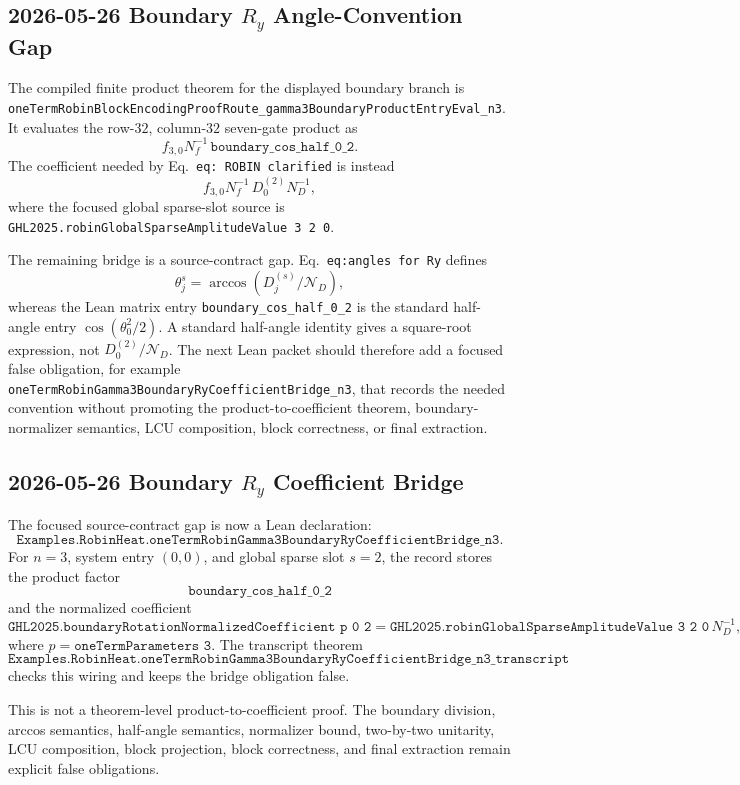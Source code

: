 \subsection{2026-05-26 Boundary \(R_y\) Angle-Convention Gap}

The compiled finite product theorem for the displayed boundary branch is
\texttt{oneTermRobinBlockEncodingProofRoute\_gamma3BoundaryProductEntryEval\_n3}.
It evaluates the row-\(32\), column-\(32\) seven-gate product as
\[
  f_{3,0}N_f^{-1}\,
  \texttt{boundary\_cos\_half\_0\_2}.
\]
The coefficient needed by Eq.~\texttt{eq: ROBIN clarified} is instead
\[
  f_{3,0}N_f^{-1}\,D_0^{(2)}N_D^{-1},
\]
where the focused global sparse-slot source is
\texttt{GHL2025.robinGlobalSparseAmplitudeValue 3 2 0}.

The remaining bridge is a source-contract gap.  Eq.~\texttt{eq:angles for Ry}
defines
\[
  \theta_j^s = \arccos(D_j^{(s)}/\mathcal{N}_D),
\]
whereas the Lean matrix entry
\texttt{boundary\_cos\_half\_0\_2} is the standard half-angle entry
\(\cos(\theta_0^2/2)\).  A standard half-angle identity gives a square-root
expression, not \(D_0^{(2)}/\mathcal{N}_D\).  The next Lean packet should
therefore add a focused false obligation, for example
\texttt{oneTermRobinGamma3BoundaryRyCoefficientBridge\_n3}, that records the
needed convention without promoting the product-to-coefficient theorem,
boundary-normalizer semantics, LCU composition, block correctness, or final
extraction.

\subsection{2026-05-26 Boundary \(R_y\) Coefficient Bridge}

The focused source-contract gap is now a Lean declaration:
\[
  \texttt{Examples.RobinHeat.oneTermRobinGamma3BoundaryRyCoefficientBridge\_n3}.
\]
For \(n=3\), system entry \((0,0)\), and global sparse slot \(s=2\), the
record stores the product factor
\[
  \texttt{boundary\_cos\_half\_0\_2}
\]
and the normalized coefficient
\[
  \texttt{GHL2025.boundaryRotationNormalizedCoefficient p 0 2}
  =
  \texttt{GHL2025.robinGlobalSparseAmplitudeValue 3 2 0}\,N_D^{-1},
\]
where \(p=\texttt{oneTermParameters 3}\).  The transcript theorem
\[
  \texttt{Examples.RobinHeat.oneTermRobinGamma3BoundaryRyCoefficientBridge\_n3\_transcript}
\]
checks this wiring and keeps the bridge obligation false.

This is not a theorem-level product-to-coefficient proof.  The boundary
division, arccos semantics, half-angle semantics, normalizer bound,
two-by-two unitarity, LCU composition, block projection, block correctness,
and final extraction remain explicit false obligations.

